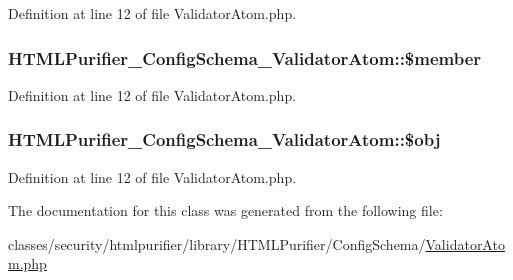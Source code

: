 Definition at line 12 of file Validator\+Atom.\+php.

\hypertarget{classHTMLPurifier__ConfigSchema__ValidatorAtom_af524e276d540c814e14e821fdb33c957}{
\subsubsection[{\$member}]{\setlength{\rightskip}{0pt plus 5cm}H\+T\+M\+L\+Purifier\+\_\+\+Config\+Schema\+\_\+\+Validator\+Atom\+::\$member}}\label{classHTMLPurifier__ConfigSchema__ValidatorAtom_af524e276d540c814e14e821fdb33c957}


Definition at line 12 of file Validator\+Atom.\+php.

\hypertarget{classHTMLPurifier__ConfigSchema__ValidatorAtom_a2e7dd0e83aa5f66cb5ca1da3f28dc05e}{
\subsubsection[{\$obj}]{\setlength{\rightskip}{0pt plus 5cm}H\+T\+M\+L\+Purifier\+\_\+\+Config\+Schema\+\_\+\+Validator\+Atom\+::\$obj}}\label{classHTMLPurifier__ConfigSchema__ValidatorAtom_a2e7dd0e83aa5f66cb5ca1da3f28dc05e}


Definition at line 12 of file Validator\+Atom.\+php.



The documentation for this class was generated from the following file\+:\begin{DoxyCompactItemize}
\item 
classes/security/htmlpurifier/library/\+H\+T\+M\+L\+Purifier/\+Config\+Schema/\hyperlink{ValidatorAtom_8php}{Validator\+Atom.\+php}\end{DoxyCompactItemize}
